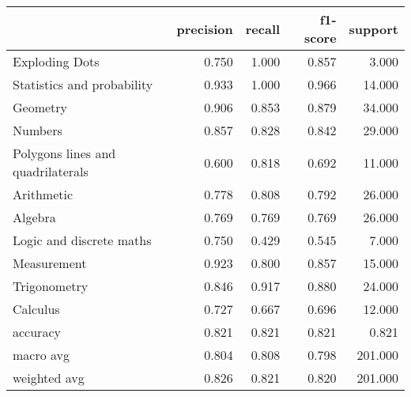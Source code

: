 \begin{tabular}{lrrrr}
\toprule
{} &  precision &  recall &  f1-score &  support \\
\midrule
Exploding Dots                    &      0.750 &   1.000 &     0.857 &    3.000 \\
Statistics and probability        &      0.933 &   1.000 &     0.966 &   14.000 \\
Geometry                          &      0.906 &   0.853 &     0.879 &   34.000 \\
Numbers                           &      0.857 &   0.828 &     0.842 &   29.000 \\
Polygons lines and quadrilaterals &      0.600 &   0.818 &     0.692 &   11.000 \\
Arithmetic                        &      0.778 &   0.808 &     0.792 &   26.000 \\
Algebra                           &      0.769 &   0.769 &     0.769 &   26.000 \\
Logic and discrete maths          &      0.750 &   0.429 &     0.545 &    7.000 \\
Measurement                       &      0.923 &   0.800 &     0.857 &   15.000 \\
Trigonometry                      &      0.846 &   0.917 &     0.880 &   24.000 \\
Calculus                          &      0.727 &   0.667 &     0.696 &   12.000 \\
accuracy                          &      0.821 &   0.821 &     0.821 &    0.821 \\
macro avg                         &      0.804 &   0.808 &     0.798 &  201.000 \\
weighted avg                      &      0.826 &   0.821 &     0.820 &  201.000 \\
\bottomrule
\end{tabular}
